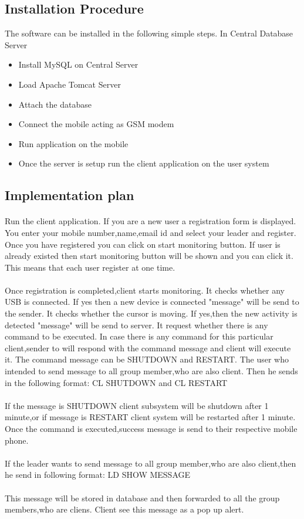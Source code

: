 \subsection{Installation Procedure}
The software can be installed in the following simple steps.
In Central Database Server
\begin{itemize}
\item Install MySQL on Central Server
\item Load Apache Tomcat Server
\item Attach the database

\item Connect the mobile acting as GSM modem
\item Run application on the mobile
\item Once the server is setup run the client application on the user system
\end{itemize}
\subsection{Implementation plan}
\paragraph{}
Run the client application. If you are a new user a registration form is displayed. You enter your mobile number,name,email id and select your leader and register. Once you have registered you can click on start monitoring  button. If user is already existed then start monitoring button will be shown and you can click it. This means that each user register at one time.
\paragraph{}
Once registration is completed,client starts monitoring. It checks whether any USB is connected. If yes then a new device is connected "message" will be send to the sender. It checks whether the cursor is moving. If yes,then the new activity is detected "message" will  be send to server. It request whether there is any command to be executed. In case there is any command for this particular client,sender to  will respond with the command message and client will execute it. The command message can be SHUTDOWN and RESTART. The user who intended to send message to all group member,who are also client. Then he sends in the following format:
CL SHUTDOWN  and 
CL RESTART
\paragraph{}
If the message is  SHUTDOWN client subsystem will be shutdown after 1 minute,or if message is RESTART client system will be restarted after 1 minute. Once the command is executed,success message is send to their respective mobile phone.
\paragraph{}
If the leader wants to send message to all group member,who are also client,then he send in following format:
LD SHOW MESSAGE
\paragraph{}
This message will be stored in database and then forwarded to all the group members,who are cliens. Client see this message as a pop up alert.
